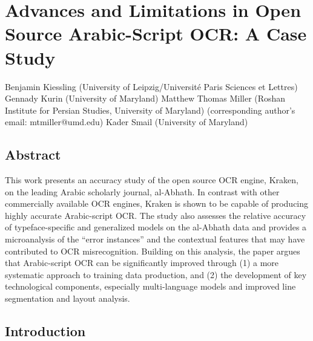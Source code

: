 ﻿\chapter{Advances and Limitations in Open Source Arabic-Script OCR: A Case Study}

Benjamin Kiessling (University of Leipzig/Université Paris Sciences et Lettres)
Gennady Kurin (University of Maryland)
Matthew Thomas Miller (Roshan Institute for Persian Studies, University of Maryland) (corresponding author’s email: mtmiller@umd.edu)
Kader Smail (University of Maryland)

\section{Abstract}

This work presents an accuracy study of the open source OCR engine, Kraken, on
the leading Arabic scholarly journal, al-Abhath. In contrast with other
commercially available OCR engines, Kraken is shown to be capable of producing
highly accurate Arabic-script OCR. The study also assesses the relative
accuracy of typeface-specific and generalized models on the al-Abhath data and
provides a microanalysis of the “error instances” and the contextual features
that may have contributed to OCR misrecognition. Building on this analysis, the
paper argues that Arabic-script OCR can be significantly improved through (1) a
more systematic approach to training data production, and (2) the development
of key technological components, especially multi-language models and improved
line segmentation and layout analysis.  

\section{Introduction}


